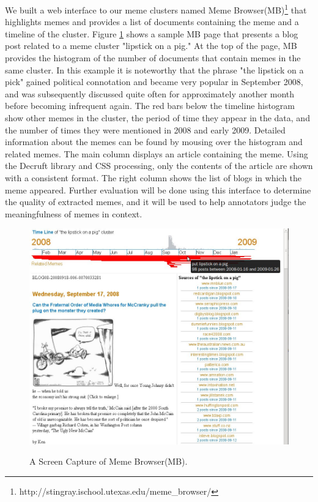 \documentclass{sig-alternate}
\begin{document}
We built a web interface to our meme clusters named Meme Browser(MB)\footnote{http://stingray.ischool.utexas.edu/meme\_browser/} that highlights memes and provides a list of documents containing the meme and a timeline of the cluster. Figure \ref{fig:mockup} shows a sample MB page that presents a blog post related to a meme cluster "lipstick on a pig." At the top of the page, MB provides the histogram of the number of documents that contain memes in the same cluster. In this example it is noteworthy that the phrase "the lipstick on a pick" gained political connotation and became very popular in September 2008, and was subsequently discussed quite often for approximately another month before becoming infrequent again. The red bars below the timeline histogram show other memes in the cluster, the period of time they appear in the data, and the number of times they were mentioned in 2008 and early 2009. Detailed information about the memes can be found by mousing over the histogram and related memes. The main column displays an article containing the meme. Using the Decruft library and CSS processing, only the contents of the article are shown with a consistent format. The right column shows the list of blogs in which the meme appeared. Further evaluation will be done using this interface to determine the quality of extracted memes, and it will be used to help annotators judge the meaningfulness of memes in context.
\begin{figure}[htb]
	\begin{center}
		{\includegraphics[width=\textwidth]{mockup.jpg}}
	\end{center}
	\caption{A Screen Capture of Meme Browser(MB).}
	\label{fig:mockup}
\end{figure}
\end{document}
